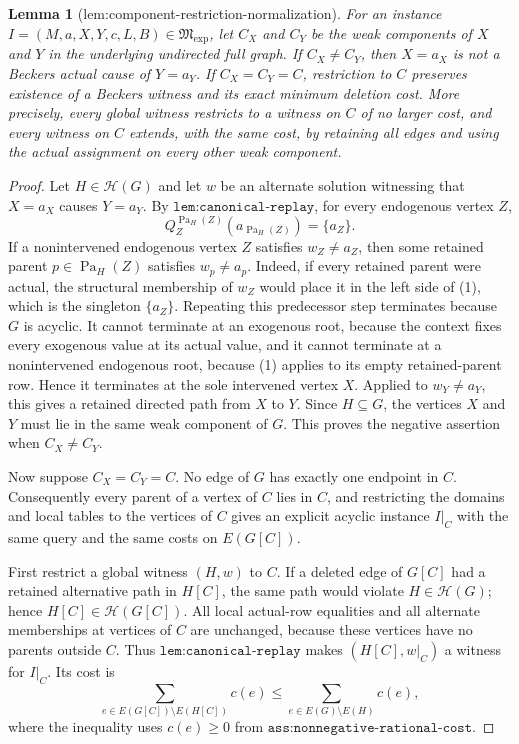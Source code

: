 \documentclass{article}
\newtheorem{lemma}{Lemma}
\begin{document}
\begin{lemma}[lem:component-restriction-normalization]\label{lem:component-restriction-normalization}
For an instance \(I=(M,a,X,Y,c,L,B)\in\mathfrak M_{\mathrm{exp}}\), let \(C_X\) and \(C_Y\) be the weak components of \(X\) and \(Y\) in the underlying undirected full graph. If \(C_X\ne C_Y\), then \(X=a_X\) is not a Beckers actual cause of \(Y=a_Y\). If \(C_X=C_Y=C\), restriction to \(C\) preserves existence of a Beckers witness and its exact minimum deletion cost. More precisely, every global witness restricts to a witness on \(C\) of no larger cost, and every witness on \(C\) extends, with the same cost, by retaining all edges and using the actual assignment on every other weak component.
\end{lemma}
\begin{proof}
Let \(H\in\mathcal H(G)\) and let \(w\) be an alternate solution witnessing that \(X=a_X\) causes \(Y=a_Y\). By \(\texttt{lem:canonical-replay}\), for every endogenous vertex \(Z\),
\[
 Q_Z^{\operatorname{Pa}_H(Z)}(a_{\operatorname{Pa}_H(Z)})=\{a_Z\}. \tag{1}
\]
If a nonintervened endogenous vertex \(Z\) satisfies \(w_Z\ne a_Z\), then some retained parent \(p\in\operatorname{Pa}_H(Z)\) satisfies \(w_p\ne a_p\). Indeed, if every retained parent were actual, the structural membership of \(w_Z\) would place it in the left side of (1), which is the singleton \(\{a_Z\}\). Repeating this predecessor step terminates because \(G\) is acyclic. It cannot terminate at an exogenous root, because the context fixes every exogenous value at its actual value, and it cannot terminate at a nonintervened endogenous root, because (1) applies to its empty retained-parent row. Hence it terminates at the sole intervened vertex \(X\). Applied to \(w_Y\ne a_Y\), this gives a retained directed path from \(X\) to \(Y\). Since \(H\subseteq G\), the vertices \(X\) and \(Y\) must lie in the same weak component of \(G\). This proves the negative assertion when \(C_X\ne C_Y\).

Now suppose \(C_X=C_Y=C\). No edge of \(G\) has exactly one endpoint in \(C\). Consequently every parent of a vertex of \(C\) lies in \(C\), and restricting the domains and local tables to the vertices of \(C\) gives an explicit acyclic instance \(I|_C\) with the same query and the same costs on \(E(G[C])\).

First restrict a global witness \((H,w)\) to \(C\). If a deleted edge of \(G[C]\) had a retained alternative path in \(H[C]\), the same path would violate \(H\in\mathcal H(G)\); hence \(H[C]\in\mathcal H(G[C])\). All local actual-row equalities and all alternate memberships at vertices of \(C\) are unchanged, because these vertices have no parents outside \(C\). Thus \(\texttt{lem:canonical-replay}\) makes \((H[C],w|_C)\) a witness for \(I|_C\). Its cost is
\[
 \sum_{e\in E(G[C])\setminus E(H[C])}c(e)
 \le
 \sum_{e\in E(G)\setminus E(H)}c(e), \tag{2}
\]
where the inequality uses \(c(e)\ge0\) from \(\texttt{ass:nonnegative-rational-cost}\).


\end{proof}
\end{document}
